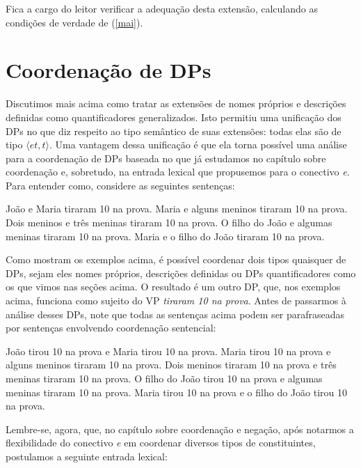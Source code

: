 \n Fica a cargo do leitor verificar a adequação desta extensão,
calculando as condições de verdade de (\ref{mai}).


\section{Coordenação de DPs}

Discutimos mais acima como tratar as extensões de nomes próprios e
descrições definidas como quantificadores generalizados. Isto
permitiu uma unificação dos DPs no que diz respeito ao tipo
semântico de suas extensões: todas elas são de tipo $\langle
et,t\rangle$. Uma vantagem dessa unificação é que ela torna
possível uma análise para a coordenação de DPs baseada no que já
estudamos no capítulo sobre coordenação e, sobretudo, na entrada
lexical que propusemos para o conectivo \textit{e}. Para entender
como, considere as seguintes sentenças:

\begin{exe}
    \ex João e Maria tiraram 10 na prova. \label{de}
    \ex Maria e alguns meninos tiraram 10 na prova. \label{df}
    \ex Dois meninos e três meninas tiraram 10 na prova. \label{dg}
    \ex O filho do João e algumas meninas tiraram 10 na prova. \label{dh}
    \ex Maria e o filho do João tiraram 10 na prova. \label{di}
\end{exe}

\n Como mostram os exemplos acima, é possível coordenar dois tipos
quaisquer de DPs, sejam eles nomes próprios, descrições definidas
ou DPs quantificadores como os que vimos nas seções acima. O
resultado é um outro DP, que, nos exemplos acima, funciona como
sujeito do VP \textit{tiraram 10 na prova}. Antes de passarmos à
análise desses DPs, note que todas as sentenças acima podem ser
parafraseadas por sentenças envolvendo coordenação sentencial:

\begin{exe}
    \ex João tirou 10 na prova e Maria tirou 10 na prova. \label{dde}
    \ex Maria tirou 10 na prova e alguns meninos tiraram 10 na prova.\label{ddf}
    \ex Dois meninos tiraram 10 na prova e três meninas tiraram 10 na prova.\label{ddg}
    \ex O filho do João tirou 10 na prova e algumas meninas tiraram 10 na prova.\label{ddh}
    \ex Maria tirou 10 na prova e o filho do João tirou 10 na prova.\label{ddi}
\end{exe}

\n Lembre-se, agora, que, no capítulo sobre coordenação e negação, após
notarmos a flexibilidade do conectivo \textit{e} em coordenar
diversos tipos de constituintes, postulamos a seguinte entrada
lexical:

